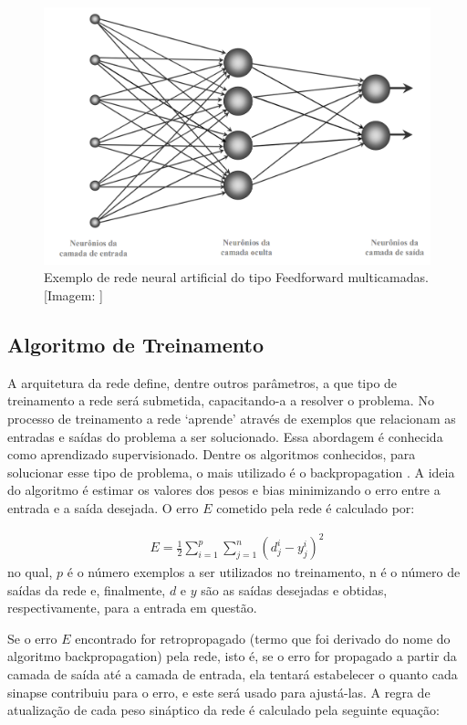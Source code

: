\begin{figure}[h]
\centering
\includegraphics[width=.75\textwidth]{figuras/multicamadas.png}
\caption{Exemplo de rede neural artificial do tipo Feedforward multicamadas. [Imagem: \cite{furtado2019redes}]}
\label{figredeFeedforwardMulticamada}
\end{figure}

\subsection{Algoritmo de Treinamento}

A arquitetura da rede define, dentre outros parâmetros, a que tipo de treinamento a rede será submetida, capacitando-a a resolver o problema. No processo de treinamento a rede ‘aprende’ através de exemplos que relacionam as entradas e saídas do problema a ser solucionado. Essa abordagem é conhecida como aprendizado supervisionado. Dentre os algoritmos conhecidos, para solucionar esse tipo de problema, o mais utilizado é o backpropagation \cite{rumelhart1986learning}. A ideia do algoritmo é estimar os valores dos pesos e bias minimizando o erro entre a entrada e a saída desejada. O erro \(E\) cometido pela rede é calculado por:

\begin{equation} \label{eq3}
\begin{split}
E = \frac{1}{2} \sum_{i=1}^{p} \sum_{j=1}^{n} (d_{j}^{i} - y_{j}^{i})^2
\end{split}
\end{equation}
no qual, \(p\) é o número exemplos a ser utilizados no treinamento, n é o número de saídas da rede e, finalmente, \(d\) e \(y\) são as saídas desejadas e obtidas, respectivamente, para a entrada em questão.

Se o erro \(E\) encontrado for retropropagado (termo que foi derivado do nome do algoritmo backpropagation) pela rede, isto é, se o erro for propagado a partir da camada de saída até a camada de entrada, ela tentará estabelecer o quanto cada sinapse contribuiu para o erro, e este será usado para ajustá-las. A regra de atualização de cada peso sináptico da rede é calculado pela seguinte equação:

